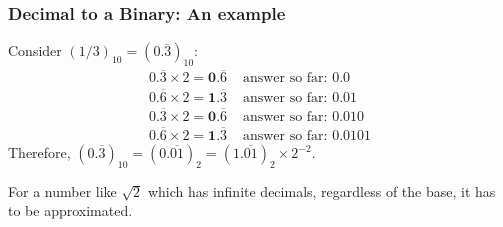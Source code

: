 


\begin{frame}\frametitle{Decimal to a Binary: An example}
Consider $(1/3)_{10}=(0.\overline{3})_{10}$:
\begin{align*}
0.\overline{3} \times 2 = \mathbf{0}.\overline{6} &\text{ answer so far: 0.0}\\
0.\overline{6} \times 2 = \mathbf{1}.\overline{3} &\text{ answer so far: 0.01}\\
0.\overline{3} \times 2 = \mathbf{0}.\overline{6} &\text{ answer so far: 0.010}\\
0.\overline{6} \times 2 = \mathbf{1}.\overline{3} &\text{ answer so far: 0.0101}
\end{align*}
Therefore, $(0.\overline{3})_{10} = (0.\overline{01})_2 =(1.\overline{01})_2 \times 2^{-2}$. 
\hfill\break

For a number like $\sqrt{2}$ which has infinite decimals, regardless of the base, it has to be approximated. 

\end{frame}

